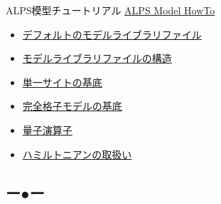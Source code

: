 \begin{frame}[t,fragile]{ALPS模型チュートリアル}
  \href{http://alps.comp-phys.org/mediawiki/index.php/Tutorials:ModelHOWTO}{ALPS Model HowTo} \\
  \begin{itemize}
  \item \href{http://alps.comp-phys.org/mediawiki/index.php/Tutorials:ModelHOWTO/ja\#.E3.83.87.E3.83.95.E3.82.A9.E3.83.AB.E3.83.88.E3.81.AE.E3.83.A2.E3.83.87.E3.83.AB.E3.83.A9.E3.82.A4.E3.83.96.E3.83.A9.E3.83.AA.E3.83.95.E3.82.A1.E3.82.A4.E3.83.AB.E3.80.80}{デフォルトのモデルライブラリファイル}
  \item \href{http://alps.comp-phys.org/mediawiki/index.php/Tutorials:ModelHOWTO/ja\#.E3.83.A2.E3.83.87.E3.83.AB.E3.83.A9.E3.82.A4.E3.83.96.E3.83.A9.E3.83.AA.E3.83.95.E3.82.A1.E3.82.A4.E3.83.AB.E3.81.AE.E6.A7.8B.E9.80.A0}{モデルライブラリファイルの構造}
  \item \href{http://alps.comp-phys.org/mediawiki/index.php/Tutorials:ModelHOWTO/ja\#.E5.8D.98.E4.B8.80.E3.82.B5.E3.82.A4.E3.83.88.E3.81.AE.E5.9F.BA.E5.BA.95}{単一サイトの基底}
  \item \href{http://alps.comp-phys.org/mediawiki/index.php/Tutorials:ModelHOWTO/ja\#.E5.AE.8C.E5.85.A8.E6.A0.BC.E5.AD.90.E3.83.A2.E3.83.87.E3.83.AB.E3.81.AE.E5.9F.BA.E5.BA.95}{完全格子モデルの基底}
  \item \href{http://alps.comp-phys.org/mediawiki/index.php/Tutorials:ModelHOWTO/ja\#.E9.87.8F.E5.AD.90.E6.BC.94.E7.AE.97.E5.AD.90}{量子演算子}
  \item \href{http://alps.comp-phys.org/mediawiki/index.php/Tutorials:ModelHOWTO/ja\#.E3.83.8F.E3.83.9F.E3.83.AB.E3.83.88.E3.83.8B.E3.82.A2.E3.83.B3.E3.81.AE.E5.8F.96.E6.89.B1.E3.81.84}{ハミルトニアンの取扱い}
  \end{itemize}
\end{frame}

\subsection*{{\protect\color{red}ー}{\protect\color{blue}●}{\protect\color{green}ー}}

